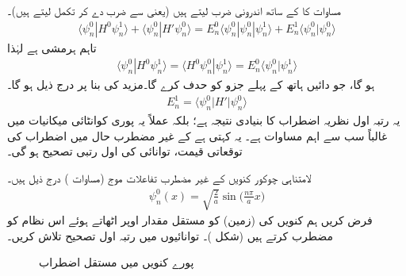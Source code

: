مساوات  کا  کے ساتھ اندرونی ضرب لیتے ہیں (یعنی  سے ضرب دے کر تکمل لیتے ہیں)۔ 
\begin{align*}
\langle \psi_n^0 | H^0 \psi_n^1 \rangle + \langle \psi_n^0 | H' \psi_n^0 \rangle = E_n^0 \langle \psi_n^0 | \psi_n^0 | \psi_n^1 \rangle + E_n^1 \langle \psi_n^0 | \psi_n^0 \rangle
\end{align*}
تاہم  ہرمشی ہے لہٰذا
\begin{align*}
\langle \psi_n^0 | H^0 \psi_n^1 \rangle = \langle H^0 \psi_n^0 | \psi_n^1 \rangle = E_n^0 \langle \psi_n^0 | \psi_n^1 \rangle
\end{align*}
 ہو گا، جو دائیں ہاتھ کے پہلے جزو کو حدف کرے گا۔مزید  
کی بنا پر درج ذیل ہو گا۔
\begin{align}\label{مساوات_غیر_اضطراب_اہم_ترین}
E_n^1 = \langle \psi_n^0 | H' | \psi_n^0 \rangle
\end{align}
یہ رتبہ اول نظریہ اضطراب کا بنیادی نتیجہ ہے؛ بلکہ عملاً یہ پوری کوانٹائی میکانیات میں غالباً سب سے اہم مساوات ہے۔ یہ کہتی ہے کے غیر مضطرب حال میں اضطراب کی توقعاتی قیمت، توانائی کی اول رتبی تصحیح ہو گی۔ 

لامتناہی چوکور کنویں کے غیر مضطرب تفاعلات موج (مساوات ) درج ذیل ہیں۔
\begin{align*}
\psi_n^0 (x) = \sqrt{\frac{2}{a}} \sin \big (\frac{n \pi}{a} x\big )
\end{align*}
 فرض کریں ہم کنویں کی  (زمین) کو مستقل مقدار  اوپر اٹھاتے ہوئے اس نظام کو مضطرب کرتے ہیں (شکل )۔ توانائیوں میں رتبہ اول تصحیح تلاش کریں۔

\begin{figure}
\centering
{}
\caption{پورے کنویں میں مستقل اضطراب}
\label{شکل_غیر_تابع_اضطراب_چکور_مستقل_اضطراب}
\end{figure}

